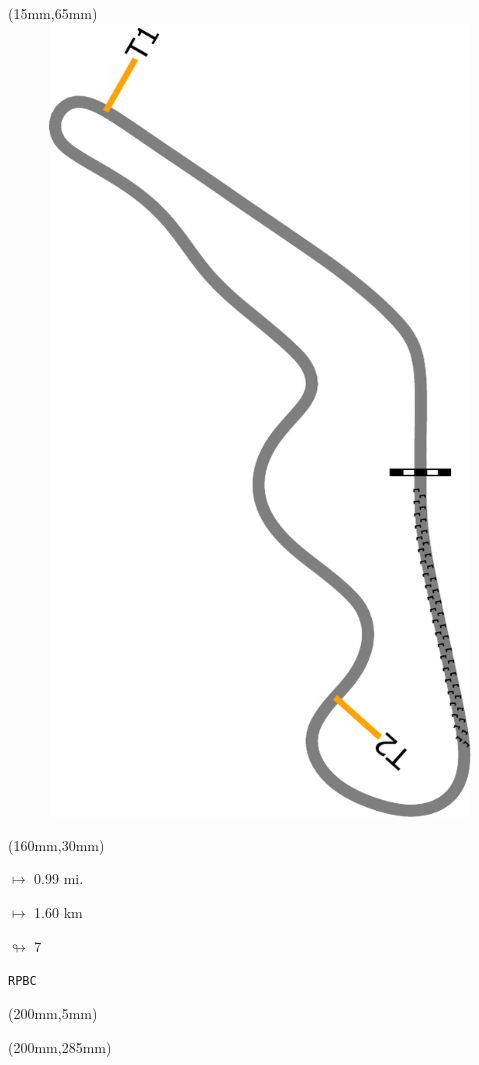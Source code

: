 \begin{textblock*}{185mm}(15mm,65mm)%
\centering
\mbox{\includegraphics[width=185mm,height=210mm,keepaspectratio]{PT/RPBC.pdf}}
\end{textblock*}
\begin{textblock*}{40mm}(160mm,30mm)%
\Large
\par$\mapsto$ 0.99 mi.
\par$\mapsto$ 1.60 km
\par$\looparrowright$ 7
\par\hfill\tiny\tt RPBC\\
\end{textblock*}
\begin{textblock*}{20mm}(200mm,5mm)%
\fbox{\thepage}
\label{RPBC}
\end{textblock*}
\begin{textblock*}{20mm}(200mm,285mm)%
\fbox{\thepage}
\end{textblock*}

